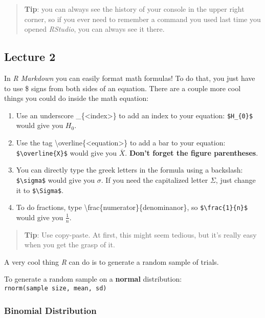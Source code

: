 \begin{quote}
\textbf{Tip}: you can always see the history of your console in the
upper right corner, so if you ever need to remember a command you used
last time you opened \emph{RStudio}, you can always see it there.
\end{quote}

\hypertarget{lecture-2}{%
\subsection{Lecture 2}\label{lecture-2}}

In \emph{R Markdown} you can easily format math formulas! To do that,
you just have to use \$ signs from both sides of an equation. There are
a couple more cool things you could do inside the math equation:

\begin{enumerate}
\def\labelenumi{\arabic{enumi}.}
\tightlist
\item
  Use an underscore \_\{\textless index\textgreater\} to add an index to
  your equation: \texttt{\$H\_\{0\}\$} would give you \(H_{0}\).
\item
  Use the tag \textbackslash overline\{\textless equation\textgreater\}
  to add a bar to your equation:
  \texttt{\$\textbackslash{}overline\{X\}\$} would give you
  \(\overline{X}\). \textbf{Don't forget the figure parentheses}.
\item
  You can directly type the greek letters in the formula using a
  backslash: \texttt{\$\textbackslash{}sigma\$} would give you
  \(\sigma\). If you need the capitalized letter \(\Sigma\), just change
  it to \texttt{\$\textbackslash{}Sigma\$}.
\item
  To do fractions, type \textbackslash frac\{numerator\}\{denominanor\},
  so \texttt{\$\textbackslash{}frac\{1\}\{n\}\$} would give you
  \(\frac{1}{n}\).
\end{enumerate}

\begin{quote}
\textbf{Tip}: Use copy-paste. At first, this might seem tedious, but
it's really easy when you get the grasp of it.
\end{quote}

A very cool thing \emph{R} can do is to generate a random sample of
trials.

To generate a random sample on a \textbf{normal} distribution:
\texttt{rnorm(sample\ size,\ mean,\ sd)}

\hypertarget{binomial-distribution}{%
\subsubsection{Binomial Distribution}\label{binomial-distribution}}

